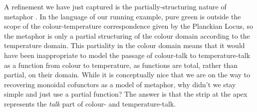 A refinement we have just captured is the partially-structuring nature of metaphor \citep{lakoff_metaphors_2003}. In the language of our running example, pure green is outside the scope of the colour-temperature correspondence given by the Planckian Locus, so the metaphor is only a partial structuring of the colour domain according to the temperature domain. This partiality in the colour domain means that it would have been inappropriate to model the passage of colour-talk to temperature-talk as a function from colour to temperature, as functions are total, rather than partial, on their domain. While it is conceptually nice that we are on the way to recovering monoidal cofunctors as a model of metaphor, why didn't we stay simple and just use a partial function? The answer is that the strip at the apex represents the \emph{talk} part of colour- and temperature-talk.

